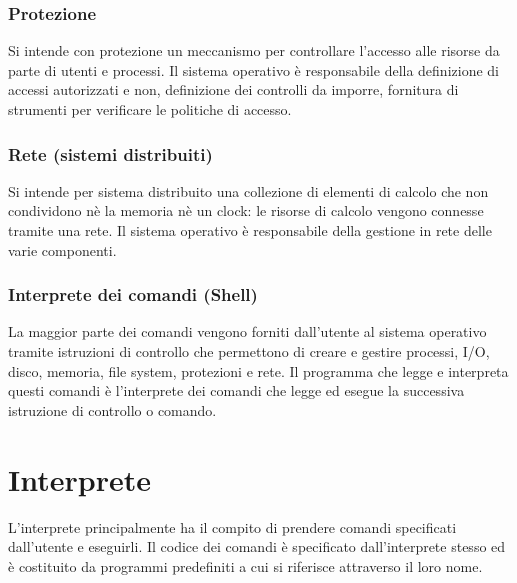 \subsubsection{Protezione}
Si intende con protezione un meccanismo per controllare l'accesso alle risorse da parte di utenti e processi. Il sistema operativo \`e responsabile della definizione di accessi autorizzati e non, definizione dei 
controlli da imporre, fornitura di strumenti per verificare le politiche di accesso. 
\subsubsection{Rete (sistemi distribuiti)}
Si intende per sistema distribuito una collezione di elementi di calcolo che non condividono n\`e la memoria n\`e un clock: le risorse di calcolo vengono connesse tramite una rete. Il sistema operativo \`e 
responsabile della gestione in rete delle varie componenti. 
\subsubsection{Interprete dei comandi (Shell)}
La maggior parte dei comandi vengono forniti dall'utente al sistema operativo tramite istruzioni di controllo che permettono di creare e gestire processi, I/O, disco, memoria, file system, protezioni e rete. Il 
programma che legge e interpreta questi comandi \`e l'interprete dei comandi che legge ed esegue la successiva istruzione di controllo o comando.
\section{Interprete}
L'interprete principalmente ha il compito di prendere comandi specificati dall'utente e eseguirli. Il codice dei comandi \`e specificato dall'interprete stesso ed \`e costituito da programmi predefiniti a cui si 
riferisce attraverso il loro nome.
